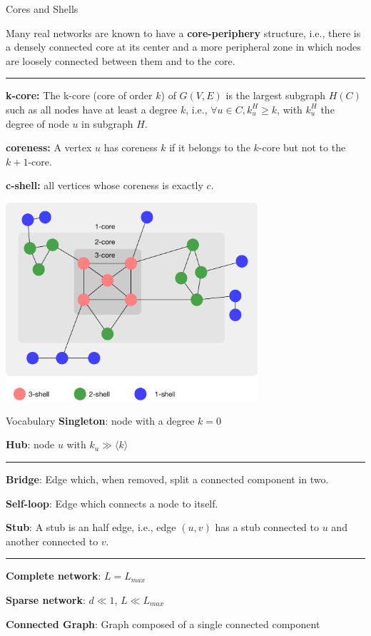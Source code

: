 \documentclass[a4paper,11pt]{book}
\begin{document}
\begin{textbox}{Cores and Shells}

Many real networks are known to have a \textbf{core-periphery} structure, i.e., there is a densely connected core at its center and a more peripheral zone in which nodes are loosely connected between them and to the core.

\noindent\rule{4cm}{0.1pt}

\textbf{k-core:} The  k-core (core of order $k$) of $G(V,E)$ is the largest subgraph $H(C)$ such as all nodes have at least a degree $k$, i.e.,  $\forall u \in C, {k}^H_u \geq k$, with $k^H_u$ the degree of node $u$ in subgraph $H$.

\textbf{coreness:} A vertex $u$ has coreness $k$ if it belongs to the $k$-core but not to the $k+1$-core.

\textbf{c-shell:} all vertices whose coreness is exactly $c$.

\centering
\includegraphics[width=0.7\textwidth]{pics/k-cores.pdf}

\end{textbox}














\begin{textbox}{Vocabulary}
\textbf{Singleton}: node with a degree $k=0$

\textbf{Hub}: node $u$ with $k_u \gg \langle k \rangle$

\noindent\rule{4cm}{0.1pt}

\textbf{Bridge}: Edge which, when removed, split a connected component in two.

\textbf{Self-loop}: Edge which connects a node to itself. 

\textbf{Stub}: A stub is an half edge, i.e., edge $(u,v)$ has a stub connected to $u$ and another connected to $v$.


\noindent\rule{4cm}{0.1pt}

\textbf{Complete network}: $L=L_{max}$

\textbf{Sparse network}: $d \ll 1$, $ L \ll L_{max}$

\textbf{Connected Graph}: Graph composed of a single connected component


\end{textbox}
\end{document}
